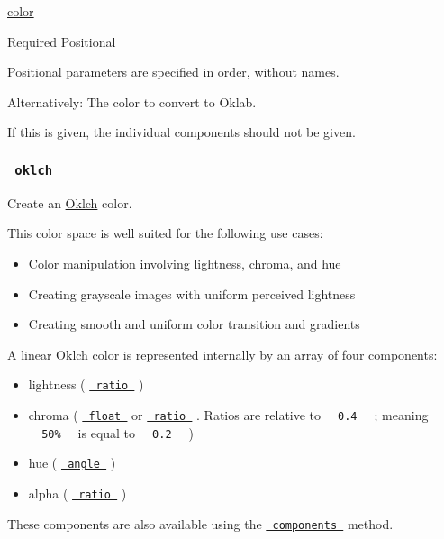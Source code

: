 \href{/docs/reference/visualize/color/}{color}

{Required} {{ Positional }}

\label{definitions-oklab-color-positional-tooltip}
Positional parameters are specified in order, without names.

Alternatively: The color to convert to Oklab.

If this is given, the individual components should not be given.

\subsubsection{\texorpdfstring{\texttt{\ oklch\ }}{ oklch }}\label{definitions-oklch}

Create an \href{https://bottosson.github.io/posts/oklab/}{Oklch} color.

This color space is well suited for the following use cases:

\begin{itemize}
\tightlist
\item
  Color manipulation involving lightness, chroma, and hue
\item
  Creating grayscale images with uniform perceived lightness
\item
  Creating smooth and uniform color transition and gradients
\end{itemize}

A linear Oklch color is represented internally by an array of four
components:

\begin{itemize}
\tightlist
\item
  lightness ( \href{/docs/reference/layout/ratio/}{\texttt{\ ratio\ }} )
\item
  chroma ( \href{/docs/reference/foundations/float/}{\texttt{\ float\ }}
  or \href{/docs/reference/layout/ratio/}{\texttt{\ ratio\ }} . Ratios
  are relative to \texttt{\ }{\texttt{\ 0.4\ }}\texttt{\ } ; meaning
  \texttt{\ }{\texttt{\ 50\%\ }}\texttt{\ } is equal to
  \texttt{\ }{\texttt{\ 0.2\ }}\texttt{\ } )
\item
  hue ( \href{/docs/reference/layout/angle/}{\texttt{\ angle\ }} )
\item
  alpha ( \href{/docs/reference/layout/ratio/}{\texttt{\ ratio\ }} )
\end{itemize}

These components are also available using the
\href{/docs/reference/visualize/color/\#definitions-components}{\texttt{\ components\ }}
method.

